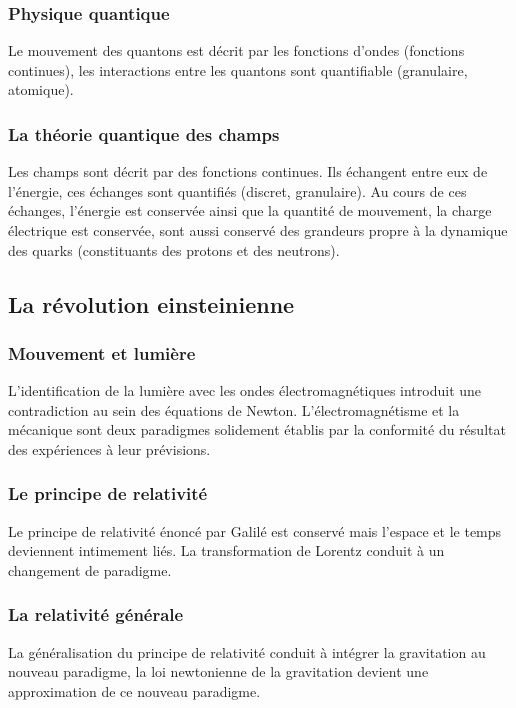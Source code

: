     \subsubsection{Physique quantique}
Le mouvement des quantons est décrit par les fonctions d'ondes (fonctions continues), les interactions entre les quantons sont quantifiable (granulaire, atomique).
    \subsubsection{La théorie quantique des champs}
Les champs sont décrit par des fonctions continues. Ils échangent entre eux de l'énergie, ces échanges sont quantifiés (discret, granulaire). Au cours de ces échanges, l'énergie est conservée ainsi que la quantité de mouvement, la charge électrique est conservée, sont aussi conservé des grandeurs propre à la dynamique des quarks (constituants des protons et des neutrons).

  \subsection{La révolution einsteinienne}
    \subsubsection{Mouvement et lumière}
L'identification de la lumière avec les ondes électromagnétiques introduit une contradiction au sein des équations de Newton.
 L'électromagnétisme et la mécanique sont deux paradigmes solidement établis par la conformité du résultat des expériences à leur prévisions.
    \subsubsection{Le principe de relativité}
Le principe de relativité énoncé par Galilé est conservé mais l'espace et le temps deviennent intimement liés. La transformation de Lorentz conduit à un changement de paradigme.
    \subsubsection{La relativité générale}
La généralisation du principe de relativité conduit à intégrer la gravitation au nouveau paradigme, la loi newtonienne de la gravitation devient une approximation de ce nouveau paradigme.







